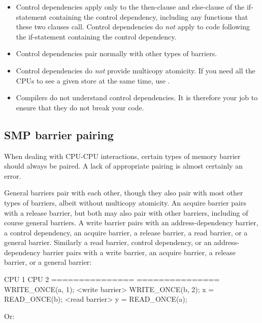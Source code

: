 \begin{itemize}
 \item
      Control dependencies apply only to the then-clause and else-clause
      of the if-statement containing the control dependency, including
      any functions that these two clauses call.
      Control dependencies do \emph{not} apply to code following the
      if-statement containing the control dependency.

 \item
      Control dependencies pair normally with other types of barriers.

 \item
      Control dependencies do \emph{not} provide multicopy atomicity.
      If you need all the CPUs to see a given store at the same time,
      use .

 \item
      Compilers do not understand control dependencies.
      It is therefore your job to ensure that they do not break your code.
\end{itemize}

\subsection{SMP barrier pairing}
\label{sec:SMP barrier pairing}

When dealing with CPU-CPU interactions, certain types of memory barrier should
always be paired.
A lack of appropriate pairing is almost certainly an error.

General barriers pair with each other, though they also pair with most
other types of barriers, albeit without multicopy atomicity.
An acquire barrier pairs with a release barrier, but both may also pair
with other barriers, including of course general barriers.
A write barrier pairs with an address-dependency barrier,
a control dependency, an acquire barrier, a release barrier,
a read barrier, or a general barrier.
Similarly a read barrier, control dependency, or
an address-dependency barrier pairs with a write barrier,
an acquire barrier, a release barrier, or a general barrier:

\begin{VerbatimU}
	CPU 1                 CPU 2
	===============       ===============
	WRITE_ONCE(a, 1);
	<write barrier>
	WRITE_ONCE(b, 2);     x = READ_ONCE(b);
	                      <read barrier>
	                      y = READ_ONCE(a);
\end{VerbatimU}

Or:

